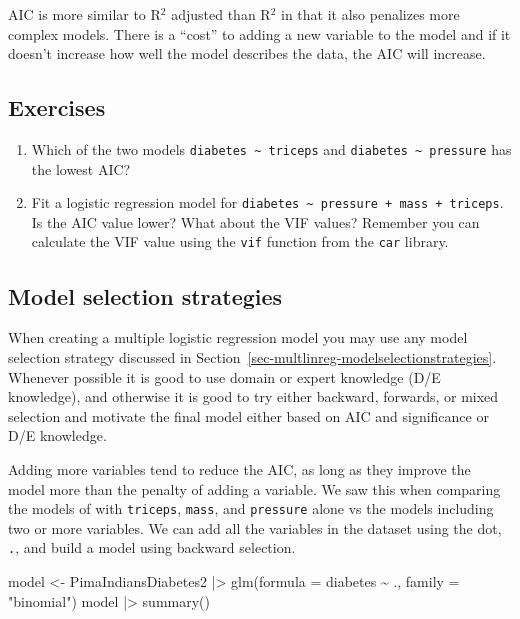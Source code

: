 \documentclass[
  letterpaper,
  DIV=11,
  numbers=noendperiod]{scrreprt}
\newenvironment{Shaded}{\begin{snugshade}}{\end{snugshade}}
\newcommand{\AttributeTok}[1]{\textcolor[rgb]{0.40,0.45,0.13}{#1}}
\newcommand{\FunctionTok}[1]{\textcolor[rgb]{0.28,0.35,0.67}{#1}}
\newcommand{\NormalTok}[1]{\textcolor[rgb]{0.00,0.23,0.31}{#1}}
\newcommand{\OtherTok}[1]{\textcolor[rgb]{0.00,0.23,0.31}{#1}}
\newcommand{\SpecialCharTok}[1]{\textcolor[rgb]{0.37,0.37,0.37}{#1}}
\newcommand{\StringTok}[1]{\textcolor[rgb]{0.13,0.47,0.30}{#1}}
\providecommand{\tightlist}{%
  \setlength{\itemsep}{0pt}\setlength{\parskip}{0pt}}\usepackage{longtable,booktabs,array}
\begin{document}
AIC is more similar to R\(^2\) adjusted than R\(^2\) in that it also
penalizes more complex models. There is a ``cost'' to adding a new
variable to the model and if it doesn't increase how well the model
describes the data, the AIC will increase.

\subsection{Exercises}\label{exercises-26}

\begin{enumerate}
\def\labelenumi{\arabic{enumi}.}
\tightlist
\item
  Which of the two models \texttt{diabetes\ \textasciitilde{}\ triceps}
  and \texttt{diabetes\ \textasciitilde{}\ pressure} has the lowest AIC?
\item
  Fit a logistic regression model for
  \texttt{diabetes\ \textasciitilde{}\ pressure\ +\ mass\ +\ triceps}.
  Is the AIC value lower? What about the VIF values? Remember you can
  calculate the VIF value using the \texttt{vif} function from the
  \texttt{car} library.
\end{enumerate}

\subsection{Model selection
strategies}\label{model-selection-strategies}

When creating a multiple logistic regression model you may use any model
selection strategy discussed in
Section~\ref{sec-multlinreg-modelselectionstrategies}. Whenever possible
it is good to use domain or expert knowledge (D/E knowledge), and
otherwise it is good to try either backward, forwards, or mixed
selection and motivate the final model either based on AIC and
significance or D/E knowledge.

Adding more variables tend to reduce the AIC, as long as they improve
the model more than the penalty of adding a variable. We saw this when
comparing the models of with \texttt{triceps}, \texttt{mass}, and
\texttt{pressure} alone vs the models including two or more variables.
We can add all the variables in the dataset using the dot, \texttt{.},
and build a model using backward selection.

\begin{Shaded}
\begin{Highlighting}[]
\NormalTok{model }\OtherTok{\textless{}{-}}\NormalTok{ PimaIndiansDiabetes2 }\SpecialCharTok{|\textgreater{}} 
  \FunctionTok{glm}\NormalTok{(}\AttributeTok{formula =}\NormalTok{ diabetes }\SpecialCharTok{\textasciitilde{}}\NormalTok{ ., }\AttributeTok{family =} \StringTok{"binomial"}\NormalTok{)}
\NormalTok{model }\SpecialCharTok{|\textgreater{}} \FunctionTok{summary}\NormalTok{()}
\end{Highlighting}
\end{Shaded}
\end{document}
